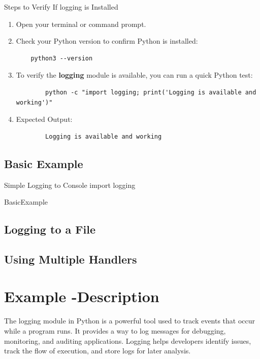 Steps to Verify If logging is Installed
\begin{enumerate}
	\item Open your terminal or command prompt.
	\item Check your Python version to confirm Python is installed:
	\begin{lstlisting}
	python3 --version
	\end{lstlisting}
	\item To verify the \textbf{logging} module is available, you can run a quick Python test:
	\begin{lstlisting}
		python -c "import logging; print('Logging is available and working')"
	\end{lstlisting}
	\item Expected Output:
	\begin{lstlisting}
		Logging is available and working
	\end{lstlisting}
\end{enumerate}


\subsection{Basic Example}

Simple Logging to Console import logging

BasicExample

	


\subsection{Logging to a File}

	


\subsection{Using Multiple Handlers}


%	



\section{Example -Description}
The logging module in Python is a powerful tool used to track events that occur while a program runs. It provides a way to log messages for debugging, monitoring, and auditing applications. Logging helps developers identify issues, track the flow of execution, and store logs for later analysis.

